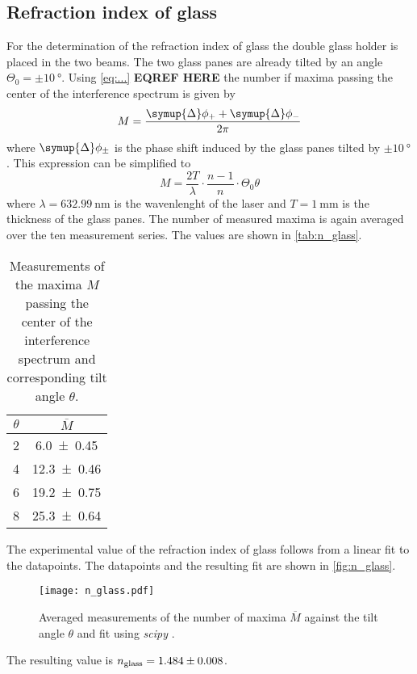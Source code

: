\subsection{Refraction index of glass}
For the determination of the refraction index of glass the double glass holder is placed in the two beams. The two glass panes are already tilted by an angle 
$\Theta_0 = \pm\qty{10}{\degree}$. 
Using \autoref{eq:...} \textbf{EQREF HERE} the number if maxima passing the center of the interference spectrum is given by
\begin{equation*}
  M = \frac{\symup{\Delta}\phi_+ + \symup{\Delta}\phi_-}{2\pi}
\end{equation*}
where $\symup{\Delta}\phi_\pm$ is the phase shift induced by the glass panes tilted by $\pm\qty{10}{\degree}$. 
This expression can be simplified to 
\begin{equation}
  M = \frac{2T}{\lambda} \cdot \frac{n-1}{n} \cdot \Theta_0 \theta
\end{equation}
where $\lambda = \qty{632.99}{\nano\metre}$ is the wavenlenght of the laser and $T = \qty{1}{\milli\metre}$ is the thickness of the glass panes.
The number of measured maxima is again averaged over the ten measurement series. The values are shown in \autoref{tab:n_glass}.
\begin{table}
  \centering
  \caption{Measurements of the maxima $M$ passing the center of the interference spectrum and corresponding tilt angle $\theta$.}
  \label{tab:n_glass}
  \begin{tabular}{ c c}
    \toprule
    {$\theta$} & {$\overline{M}$} \\
    \midrule
    {2} & {\num{ 6.0 +- 0.45}} \\
    {4} & {\num{12.3 +- 0.46}} \\
    {6} & {\num{19.2 +- 0.75}} \\
    {8} & {\num{25.3 +- 0.64}} \\
    \bottomrule
  \end{tabular}
\end{table}
The experimental value of the refraction index of glass follows from a linear fit to the datapoints.
The datapoints and the resulting fit are shown in \autoref{fig:n_glass}.
\begin{figure}
  \centering
  \texttt{[image: n\_glass.pdf]}
  \caption{Averaged measurements of the number of maxima $\overline{M}$ against the tilt angle $\theta$ and fit using \textit{scipy} \cite{scipy}.}
  \label{fig:n_glass}
\end{figure}
The resulting value is $n_\text{glass} = \num{1.484 +- 0.008}$.

